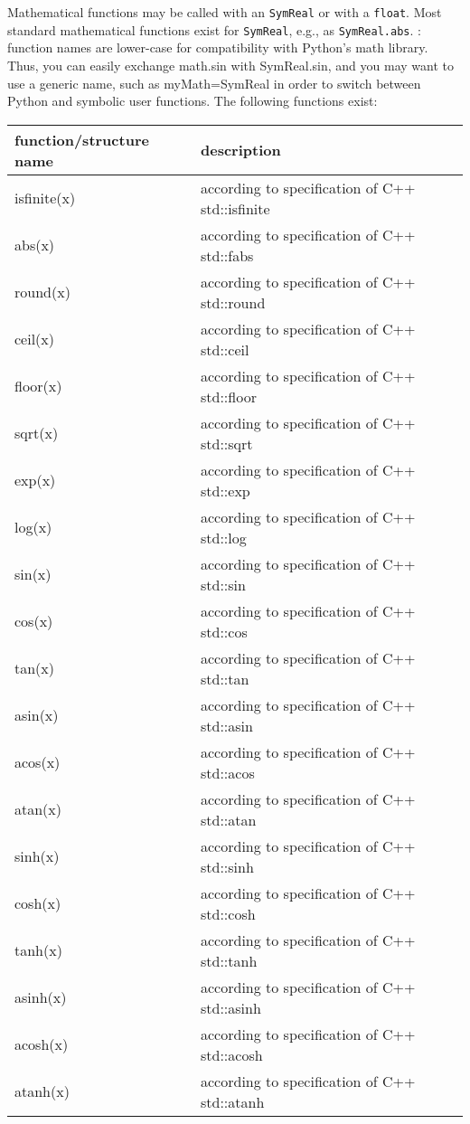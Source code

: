 Mathematical functions may be called with an \texttt{SymReal} or with a \texttt{float}. Most standard mathematical functions exist for \texttt{SymReal}, e.g., as \texttt{SymReal.abs}. : function names are lower-case for compatibility with Python's math library. Thus, you can easily exchange math.sin with SymReal.sin, and you may want to use a generic name, such as myMath=SymReal in order to switch between Python and symbolic user functions. The following functions exist:
\begin{center}
\footnotesize
\begin{longtable}{| p{8cm} | p{8cm} |} 
\hline
{\bf function/structure name} & {\bf description}\\ \hline
  isfinite(x) & according to specification of C++ std::isfinite\\ \hline 
  abs(x) & according to specification of C++ std::fabs\\ \hline 
  round(x) & according to specification of C++ std::round\\ \hline 
  ceil(x) & according to specification of C++ std::ceil\\ \hline 
  floor(x) & according to specification of C++ std::floor\\ \hline 
  sqrt(x) & according to specification of C++ std::sqrt\\ \hline 
  exp(x) & according to specification of C++ std::exp\\ \hline 
  log(x) & according to specification of C++ std::log\\ \hline 
  sin(x) & according to specification of C++ std::sin\\ \hline 
  cos(x) & according to specification of C++ std::cos\\ \hline 
  tan(x) & according to specification of C++ std::tan\\ \hline 
  asin(x) & according to specification of C++ std::asin\\ \hline 
  acos(x) & according to specification of C++ std::acos\\ \hline 
  atan(x) & according to specification of C++ std::atan\\ \hline 
  sinh(x) & according to specification of C++ std::sinh\\ \hline 
  cosh(x) & according to specification of C++ std::cosh\\ \hline 
  tanh(x) & according to specification of C++ std::tanh\\ \hline 
  asinh(x) & according to specification of C++ std::asinh\\ \hline 
  acosh(x) & according to specification of C++ std::acosh\\ \hline 
  atanh(x) & according to specification of C++ std::atanh\\ \hline 
\end{longtable}
\end{center}

